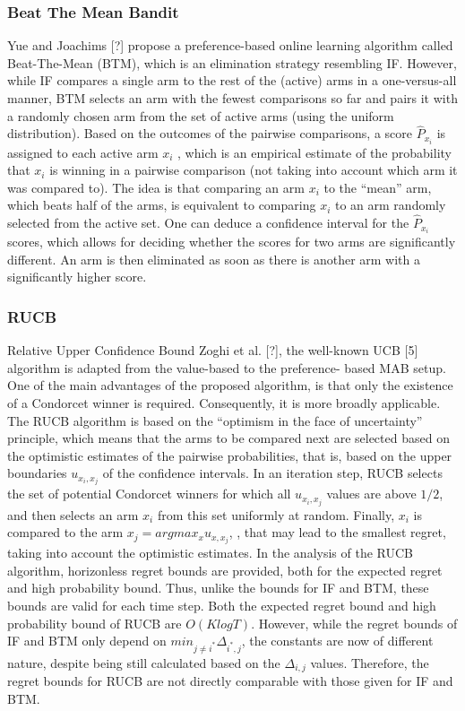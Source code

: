 \documentclass{llncs}
\begin{document}
\subsubsection{Beat The Mean Bandit}	
	Yue and Joachims [?] propose a preference-based online learning algorithm called Beat-The-Mean (BTM), which is an elimination strategy resembling IF. 
	However, while IF compares a single arm to the rest of the (active) arms in a one-versus-all manner, BTM selects an arm with the fewest comparisons so far and pairs it with a randomly chosen arm from the set of active arms (using the uniform distribution). 
	Based on the outcomes of the pairwise comparisons, a score $\hat{P}_{x_i}$ is assigned to each active arm $x_i$ , which is an empirical estimate of the probability that $x_i$ is winning in a pairwise comparison (not taking into account which arm it was compared to).
	The idea is that comparing an arm $x_i$ to the “mean” arm, which beats half of the arms, is equivalent to comparing $x_i$ to an arm randomly selected from the active set. One can deduce a confidence interval for the $\hat{P}_{x_i}$ scores, which allows for deciding whether the scores for two arms are significantly different. 
	An arm is then eliminated as soon as there is another arm with a significantly higher score.
	

\newpage

\subsubsection{RUCB} Relative Upper Confidence Bound
	Zoghi et al. [?], the well-known UCB [5] algorithm is adapted from the value-based to the preference- based MAB setup. 
	One of the main advantages of the proposed algorithm, is that only the existence of a Condorcet winner is required. 
	Consequently, it is more broadly applicable. The RUCB algorithm is based on the “optimism in the face of uncertainty” principle, which means that the arms to be compared next are selected based on the optimistic estimates of the pairwise probabilities, that is, based on the upper boundaries $u_{x_i,x_j}$ of the confidence intervals. 
	In an iteration step, RUCB selects the set of potential Condorcet winners for which all $u_{x_i,x_j}$ values are above $1/2$, and then selects an arm $x_i$ from this set uniformly at random. 
	Finally, $x_i$ is compared to the arm $x_j = argmax_{x} u_{x,x_j}$, , that may lead to the smallest regret, taking into account the optimistic estimates. 
	In the analysis of the RUCB algorithm, horizonless regret bounds are provided, both for the expected regret and high probability bound. Thus, unlike the bounds for IF and BTM, these bounds are valid for each time step. 
	Both the expected regret bound and high probability bound of RUCB are $O(K log T)$.
	However, while the regret bounds of IF and BTM only depend on $ min_{j \neq i^*}  \Delta_{i^*,j}$, the constants are now of different nature, despite being still calculated based on the $\Delta_{i,j}$  values.
	Therefore, the regret bounds for RUCB are not directly comparable with those given for IF and BTM.
	
	\newpage
\end{document}
